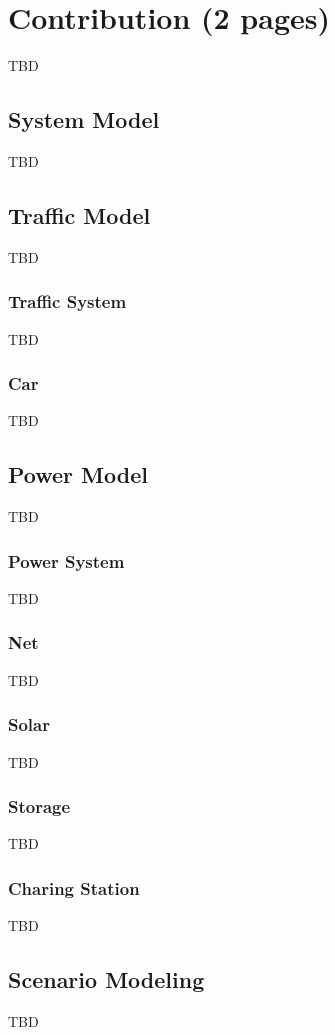 \section{Contribution (2 pages)}

TBD

\subsection{System Model}

TBD

\subsection{Traffic Model}

TBD

\subsubsection{Traffic System}

TBD

\subsubsection{Car}

TBD

\subsection{Power Model}

TBD

\subsubsection{Power System}

TBD

\subsubsection{Net}

TBD

\subsubsection{Solar}

TBD

\subsubsection{Storage}

TBD

\subsubsection{Charing Station}

TBD

\subsection{Scenario Modeling}

TBD